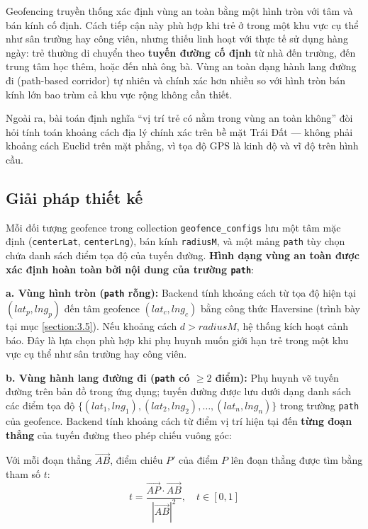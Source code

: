 \documentclass[../DoAn.tex]{subfiles}
\begin{document}
Geofencing truyền thống xác định vùng an toàn bằng một hình tròn với tâm và bán kính cố định. Cách tiếp cận này phù hợp khi trẻ ở trong một khu vực cụ thể như sân trường hay công viên, nhưng thiếu linh hoạt với thực tế sử dụng hàng ngày: trẻ thường di chuyển theo \textbf{tuyến đường cố định} từ nhà đến trường, đến trung tâm học thêm, hoặc đến nhà ông bà. Vùng an toàn dạng hành lang đường đi (path-based corridor) tự nhiên và chính xác hơn nhiều so với hình tròn bán kính lớn bao trùm cả khu vực rộng không cần thiết.

Ngoài ra, bài toán định nghĩa ``vị trí trẻ có nằm trong vùng an toàn không'' đòi hỏi tính toán khoảng cách địa lý chính xác trên bề mặt Trái Đất — không phải khoảng cách Euclid trên mặt phẳng, vì tọa độ GPS là kinh độ và vĩ độ trên hình cầu.

\subsection{Giải pháp thiết kế}

Mỗi đối tượng geofence trong collection \texttt{geofence\_configs} lưu một tâm mặc định (\texttt{centerLat}, \texttt{centerLng}), bán kính \texttt{radiusM}, và một mảng \texttt{path} tùy chọn chứa danh sách điểm tọa độ của tuyến đường. \textbf{Hình dạng vùng an toàn được xác định hoàn toàn bởi nội dung của trường \texttt{path}}:

\textbf{a. Vùng hình tròn (\texttt{path} rỗng):} Backend tính khoảng cách từ tọa độ hiện tại $(lat_p, lng_p)$ đến tâm geofence $(lat_c, lng_c)$ bằng công thức Haversine (trình bày tại mục \ref{section:3.5}). Nếu khoảng cách $d > radiusM$, hệ thống kích hoạt cảnh báo. Đây là lựa chọn phù hợp khi phụ huynh muốn giới hạn trẻ trong một khu vực cụ thể như sân trường hay công viên.

\textbf{b. Vùng hành lang đường đi (\texttt{path} có $\geq 2$ điểm):} Phụ huynh vẽ tuyến đường trên bản đồ trong ứng dụng; tuyến đường được lưu dưới dạng danh sách các điểm tọa độ $\{(lat_1, lng_1), (lat_2, lng_2), \ldots, (lat_n, lng_n)\}$ trong trường \texttt{path} của geofence. Backend tính khoảng cách từ điểm vị trí hiện tại đến \textbf{từng đoạn thẳng} của tuyến đường theo phép chiếu vuông góc:

Với mỗi đoạn thẳng $\overrightarrow{AB}$, điểm chiếu $P'$ của điểm $P$ lên đoạn thẳng được tìm bằng tham số $t$:
\begin{equation}
t = \frac{\overrightarrow{AP} \cdot \overrightarrow{AB}}{|\overrightarrow{AB}|^2}, \quad t \in [0, 1]
\label{eq:projection}
\end{equation}
\end{document}
